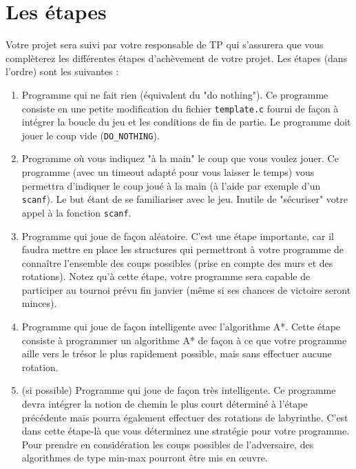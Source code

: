 \documentclass[french,12pt,a4paper,twoside,openright,titlepage]{report}
\begin{document}
\section{Les étapes}
Votre projet sera suivi par votre responsable de TP qui s'assurera que vous complèterez les différentes étapes d'achèvement de votre projet. Les étapes (dans l'ordre) sont les suivantes : 
\begin{enumerate}
 \item Programme qui ne fait rien (équivalent du "do nothing"). Ce programme consiste en une petite modification du fichier \verb|template.c| fourni de façon à intégrer la boucle du jeu et les conditions de fin de partie. Le programme doit jouer le coup vide (\verb|DO_NOTHING|).
 \item Programme où vous indiquez "à la main" le coup que vous voulez jouer. Ce programme (avec un timeout adapté pour vous laisser le temps) vous permettra d'indiquer le coup joué à la main (à l'aide par exemple d'un \verb|scanf|). Le but étant de se familiariser avec le jeu. Inutile de "sécuriser" votre appel à la fonction \verb|scanf|.
 \item Programme qui joue de façon aléatoire. C'est une étape importante, car il faudra mettre en place les structures qui permettront à votre programme de connaître l'ensemble des coups possibles (prise en compte des murs et des rotations). Notez qu'à cette étape, votre programme sera capable de participer au tournoi prévu fin janvier (même si ses chances de victoire seront minces).
 \item Programme qui joue de façon intelligente avec l'algorithme A*. Cette étape consiste à programmer un algorithme A*
 de façon à ce que votre programme aille vers le trésor le plus rapidement possible, mais sans effectuer aucune rotation.
 \item (si possible) Programme qui joue de façon très intelligente. Ce programme devra intégrer la notion de chemin le plus court déterminé à l'étape précédente mais pourra également effectuer des rotations de labyrinthe. C'est dans cette étape-là que vous déterminez une stratégie pour votre programme.\\
 Pour prendre en considération les coups possibles de l'adversaire, des algorithmes de type min-max pourront être mis en \oe uvre.
 \end{enumerate}
\end{document}
